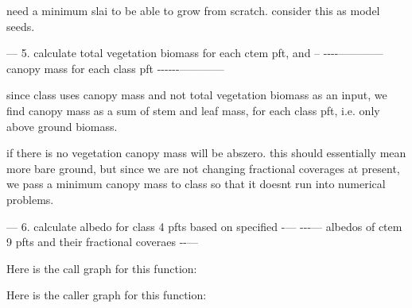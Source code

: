 need a minimum slai to be able to grow from scratch. consider this as model seeds.

--- 5. calculate total vegetation biomass for each ctem pft, and -- -\/-\/-\/-\/------------ canopy mass for each class pft -\/-\/-\/-\/-\/-\/------------

since class uses canopy mass and not total vegetation biomass as an input, we find canopy mass as a sum of stem and leaf mass, for each class pft, i.\+e. only above ground biomass.

if there is no vegetation canopy mass will be abszero. this should essentially mean more bare ground, but since we are not changing fractional coverages at present, we pass a minimum canopy mass to class so that it doesn\textquotesingle{}t run into numerical problems.

--- 6. calculate albedo for class\textquotesingle{} 4 pfts based on specified -\/--- -\/-\/-\/--- albedos of ctem 9 pfts and their fractional coveraes -\/-\/---

Here is the call graph for this function\+:




Here is the caller graph for this function\+:


